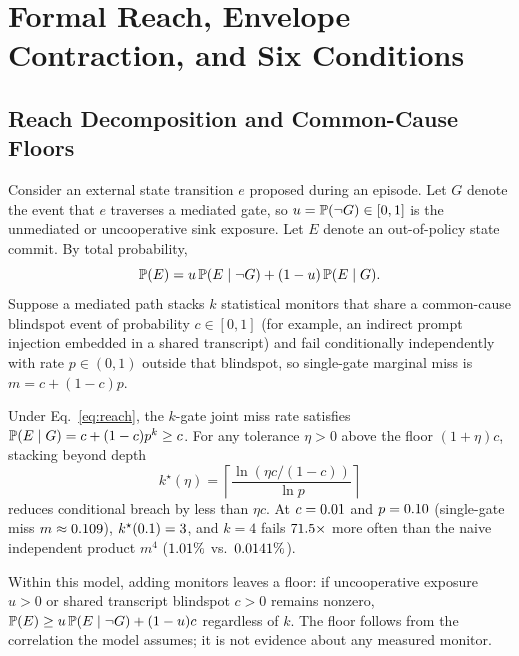 \section{Formal Reach, Envelope Contraction, and Six Conditions}\label{sec:theory}

\subsection{Reach Decomposition and Common-Cause Floors}

Consider an external state transition \(e\) proposed during an episode. Let \(G\) denote the event that \(e\) traverses a mediated gate, so \(u = \mathbb{P}(\neg G) \in [0,1]\) is the unmediated or uncooperative sink exposure. Let \(E\) denote an out-of-policy state commit. By total probability,
\begin{equation}\label{eq:reach}
  \mathbb{P}(E) = u\,\mathbb{P}(E \mid \neg G) + (1 - u)\,\mathbb{P}(E \mid G).
\end{equation}
Suppose a mediated path stacks \(k\) statistical monitors that share a common-cause blindspot event of probability \(c \in [0,1]\) (for example, an indirect prompt injection embedded in a shared transcript) and fail conditionally independently with rate \(p \in (0,1)\) outside that blindspot, so single-gate marginal miss is \(m = c + (1 - c)p\).

\begin{proposition}\label{prop:saturation}
Under Eq.~\eqref{eq:reach}, the \(k\)-gate joint miss rate satisfies \(\mathbb{P}(E \mid G) = c + (1 - c)p^k \ge c\). For any tolerance \(\eta > 0\) above the floor \((1+\eta)c\), stacking beyond depth
\begin{equation}\label{eq:kstar}
  k^\star(\eta) = \left\lceil \frac{\ln(\eta c / (1 - c))}{\ln p} \right\rceil
\end{equation}
reduces conditional breach by less than \(\eta c\). At \(c = 0.01\) and \(p = 0.10\) (single-gate miss \(m \approx 0.109\)), \(k^\star(0.1) = 3\), and \(k = 4\) fails \(71.5\times\) more often than the naive independent product \(m^4\) (\(1.01\%\) vs.\ \(0.0141\%\)).
\end{proposition}

Within this model, adding monitors leaves a floor: if uncooperative exposure \(u > 0\) or shared transcript blindspot \(c > 0\) remains nonzero, \(\mathbb{P}(E) \ge u\,\mathbb{P}(E \mid \neg G) + (1 - u)c\) regardless of \(k\). The floor follows from the correlation the model assumes; it is not evidence about any measured monitor.

